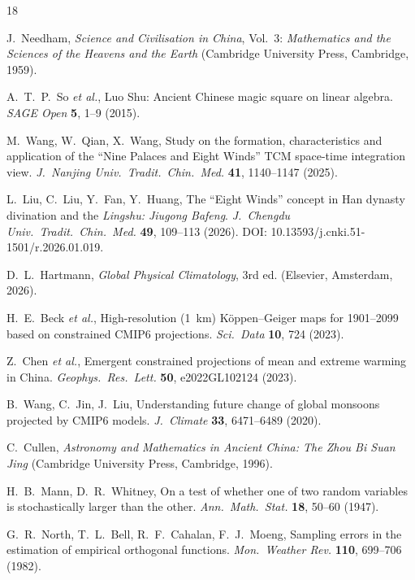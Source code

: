 \documentclass[9pt,twocolumn]{article}
\begin{document}
\vspace{10pt}
\begin{thebibliography}{18}

 J.~Needham, \textit{Science and Civilisation in China}, Vol.~3: \textit{Mathematics and the Sciences of the Heavens and the Earth} (Cambridge University Press, Cambridge, 1959).

 A.~T.~P.~So \textit{et al.}, Luo Shu: Ancient Chinese magic square on linear algebra. \textit{SAGE Open} \textbf{5}, 1--9 (2015).

 M.~Wang, W.~Qian, X.~Wang, Study on the formation, characteristics and application of the ``Nine Palaces and Eight Winds'' TCM space-time integration view. \textit{J.~Nanjing Univ.~Tradit.~Chin.~Med.} \textbf{41}, 1140--1147 (2025).

 L.~Liu, C.~Liu, Y.~Fan, Y.~Huang, The ``Eight Winds'' concept in Han dynasty divination and the \textit{Lingshu: Jiugong Bafeng}. \textit{J.~Chengdu Univ.~Tradit.~Chin.~Med.} \textbf{49}, 109--113 (2026). DOI: 10.13593/j.cnki.51-1501/r.2026.01.019.

 D.~L.~Hartmann, \textit{Global Physical Climatology}, 3rd ed. (Elsevier, Amsterdam, 2026).

 H.~E.~Beck \textit{et al.}, High-resolution (1~km) K\"oppen--Geiger maps for 1901--2099 based on constrained CMIP6 projections. \textit{Sci.~Data} \textbf{10}, 724 (2023).

 Z.~Chen \textit{et al.}, Emergent constrained projections of mean and extreme warming in China. \textit{Geophys.~Res.~Lett.} \textbf{50}, e2022GL102124 (2023).

 B.~Wang, C.~Jin, J.~Liu, Understanding future change of global monsoons projected by CMIP6 models. \textit{J.~Climate} \textbf{33}, 6471--6489 (2020).

 C.~Cullen, \textit{Astronomy and Mathematics in Ancient China: The Zhou Bi Suan Jing} (Cambridge University Press, Cambridge, 1996).

 H.~B.~Mann, D.~R.~Whitney, On a test of whether one of two random variables is stochastically larger than the other. \textit{Ann.~Math.~Stat.} \textbf{18}, 50--60 (1947).

 G.~R.~North, T.~L.~Bell, R.~F.~Cahalan, F.~J.~Moeng, Sampling errors in the estimation of empirical orthogonal functions. \textit{Mon.~Weather Rev.} \textbf{110}, 699--706 (1982).


\end{thebibliography}
\end{document}
